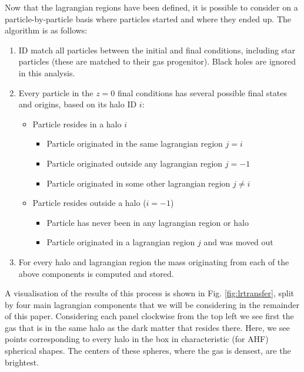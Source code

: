 Now that the lagrangian regions have been defined, it is possible to consider on
a particle-by-particle basis where particles started and where they ended up.
The algorithm is as follows:
\begin{enumerate}
	\item ID match all particles between the initial and final conditions, including
	      star particles (these are matched to their gas progenitor). Black holes
	      are ignored in this analysis.

	\item Every particle in the $z=0$ final conditions has several possible final
	      states and origins, based on its halo ID $i$:
	      \begin{itemize}
	            \item Particle resides in a halo $i$
	            \begin{itemize}
	           		\item Particle originated in the same lagrangian region $j = i$
	           		\item Particle originated outside any lagrangian region $j = -1$
	           		\item Particle originated in some other lagrangian region $j \neq i$
	            \end{itemize}
	            \item Particle resides outside a halo ($i = -1$)
	            \begin{itemize}
	            	\item Particle has never been in any lagrangian region or halo
	            	\item Particle originated in a lagrangian region $j$ and was moved out
	            \end{itemize}
	      \end{itemize}
	      
	\item For every halo and lagrangian region the mass originating from each
	      of the above components is computed and stored.
\end{enumerate}


A visualisation of the results of this process is shown in Fig. \ref{fig:lrtransfer},
split by four main lagrangian components that we will be considering in the
remainder of this paper. Considering each panel clockwise from the top left
we see first the gas that is in the same halo as the dark matter that resides there.
Here, we see points corresponding to every halo in the box in characteristic (for
AHF) spherical shapes. The centers of these spheres, where the gas is densest,
are the brightest.


